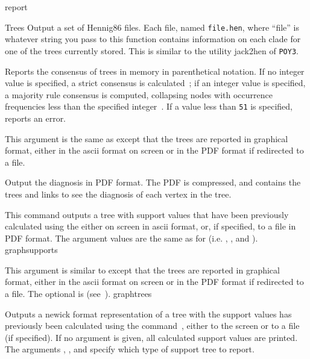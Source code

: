 \begin{command}{report}{}
\begin{arguments}
\begin{argumentgroup}{Trees}
{Output a set of Hennig86 files. Each file, named \texttt{file.hen},
where ``file'' is whatever string you pass to this function
contains information on each clade for one of the trees
currently stored. This is similar to the utility jack2hen 
of \texttt{POY3}.}
{}

{Reports the consensus of trees in memory in parenthetical notation.
If no integer value is specified, a strict consensus is calculated~\cite{rohlf1982};
if an integer value is specified, a majority rule consensus is computed, 
collapsing nodes with occurrence frequencies less than the specified 
integer~\cite{margush1981}. If a value less than \texttt{51} is specified, 
\poy reports an error.} 
{}

{This argument is the same as  except 
that the trees are reported in graphical format, either in the ascii 
format on screen or in the PDF format if redirected to a file.}
{}

{Output the diagnosis in PDF format. The PDF is compressed, and
contains the trees and links to see the diagnosis of each vertex
in the tree.}
{}

{This command outputs a tree with support values that have
been previously calculated using the
 either on screen
in ascii format, or, if specified, to a file in PDF
format. The argument values are the same as for 
 (i.e. ,
, and ).} 
{graphsupports}

{This argument is similar to  except that
the trees are reported in graphical format, either in the ascii 
format on screen or in the PDF format if redirected to a file.
The optional \poylident is  
(see~).}
{graphtrees}

{Outputs a newick format representation of a tree with the
support values has previously been calculated using the
command~,
either to the screen or to a file (if specified). If no argument
is given, all calculated support values are printed. The arguments
, , and
 specify which type of support tree to
report. 

}
\end{argumentgroup}
\end{arguments}
\end{command}
